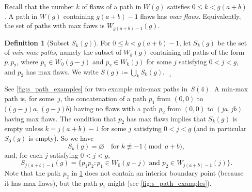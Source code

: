 \documentclass[11pt]{article}
\newcommand{\lrcornerqed}[0]{}
\renewcommand{\lrcornerqed}[0]{\hfill $\lrcorner$} %
\theoremstyle{definition} %
\newtheorem{definition}[thm]{Definition}
\numberwithin{equation}{section}
\begin{document}
Recall that the number $k$ of flaws of a path in $W(g)$ satisfies $0\le k<g(a+b)$. A path in $W(g)$ containing $g(a+b)-1$ flaws has \textit{max flaws}.  Equivalently, the set of paths with max flaws is $W_{g(a+b)-1}(g)$.

\begin{definition}[Subset $S_k(g)$]
\label{def:S} For $0 \leq k < g(a+b)-1$,  let $S_k(g)$ be the 
set of \textit{min-max paths}, namely the subset of $W_k(g)$ containing all 
paths of the form $p_1p_2$, where
    $p_1 \in W_0(g-j)$ and $p_2 \in W_k(j)$  for some $j$ satisfying $0<j<g$, and $p_2$ has max flaws.
    We write $S(g) \coloneqq  \bigcup_{k} S_k(g)$. 
    \lrcornerqed
\end{definition}

See \cref{fig:s_path_examples} for two example min-max paths in~$S(4)$.
A min-max path is, for some~$j$, the concatenation of a path $p_1$ from $(0,0)$ to $\big((g-j)a,(g-j)b\big)$ having no flaws with a path $p_2$ from 
$(0,0)$ to $(ja,jb)$ having max flaws. 
The condition that $p_2$ has max flaws implies that $S_k(g)$ is empty unless $k=j(a+b)-1$ for some $j$ satisfying $0 < j < g$ (and in particular $S_0(g)$ is empty).
So we have
\begin{equation}
    S_k(g) = \varnothing \quad \mbox{for $k \not\equiv -1\pmod{a+b}$}, \label{eqn:S1}
\end{equation}
and, for each $j$ satisfying $0 < j < g$, 
\begin{equation}
    S_{j(a+b)-1}(g) = \Big\{p_1 p_2 : p_1 \in W_0(g-j) \mbox{ and } p_2 \in W_{j(a+b)-1}(j)\Big\} \label{eqn:S2}.
\end{equation}
Note that the path $p_2$ in \cref{def:S} does not contain an interior boundary point (because it has max flaws), but the path $p_1$ might (see \cref{fig:s_path_examples}).
\end{document}
